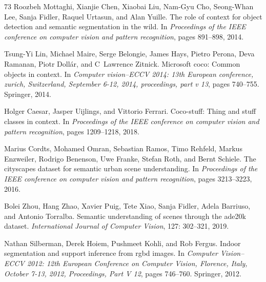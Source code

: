 \documentclass{article}
\begin{document}
\begin{thebibliography}{73}
Roozbeh Mottaghi, Xianjie Chen, Xiaobai Liu, Nam-Gyu Cho, Seong-Whan Lee, Sanja
  Fidler, Raquel Urtasun, and Alan Yuille.
\newblock The role of context for object detection and semantic segmentation in
  the wild.
\newblock In \emph{Proceedings of the IEEE conference on computer vision and
  pattern recognition}, pages 891--898, 2014.

Tsung-Yi Lin, Michael Maire, Serge Belongie, James Hays, Pietro Perona, Deva
  Ramanan, Piotr Doll{\'a}r, and C~Lawrence Zitnick.
\newblock Microsoft coco: Common objects in context.
\newblock In \emph{Computer vision--ECCV 2014: 13th European conference,
  zurich, Switzerland, September 6-12, 2014, proceedings, part v 13}, pages
  740--755. Springer, 2014.

Holger Caesar, Jasper Uijlings, and Vittorio Ferrari.
\newblock Coco-stuff: Thing and stuff classes in context.
\newblock In \emph{Proceedings of the IEEE conference on computer vision and
  pattern recognition}, pages 1209--1218, 2018.

Marius Cordts, Mohamed Omran, Sebastian Ramos, Timo Rehfeld, Markus Enzweiler,
  Rodrigo Benenson, Uwe Franke, Stefan Roth, and Bernt Schiele.
\newblock The cityscapes dataset for semantic urban scene understanding.
\newblock In \emph{Proceedings of the IEEE conference on computer vision and
  pattern recognition}, pages 3213--3223, 2016.

Bolei Zhou, Hang Zhao, Xavier Puig, Tete Xiao, Sanja Fidler, Adela Barriuso,
  and Antonio Torralba.
\newblock Semantic understanding of scenes through the ade20k dataset.
\newblock \emph{International Journal of Computer Vision}, 127:
  302--321, 2019.

Nathan Silberman, Derek Hoiem, Pushmeet Kohli, and Rob Fergus.
\newblock Indoor segmentation and support inference from rgbd images.
\newblock In \emph{Computer Vision--ECCV 2012: 12th European Conference on
  Computer Vision, Florence, Italy, October 7-13, 2012, Proceedings, Part V
  12}, pages 746--760. Springer, 2012.


\end{thebibliography}
\end{document}
